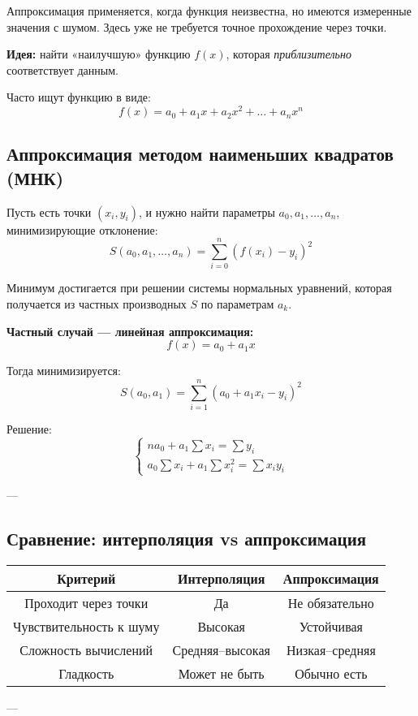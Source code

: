 Аппроксимация применяется, когда функция неизвестна, но имеются измеренные значения с шумом. Здесь уже не требуется точное прохождение через точки.

\textbf{Идея:} найти «наилучшую» функцию $f(x)$, которая \textit{приблизительно} соответствует данным.

Часто ищут функцию в виде:
\[
f(x) = a_0 + a_1 x + a_2 x^2 + \dots + a_n x^n
\]

\subsection*{Аппроксимация методом наименьших квадратов (МНК)}

Пусть есть точки $(x_i, y_i)$, и нужно найти параметры $a_0, a_1, \dots, a_n$, минимизирующие отклонение:
\[
S(a_0, a_1, \dots, a_n) = \sum_{i=0}^n \left(f(x_i) - y_i\right)^2
\]

Минимум достигается при решении системы нормальных уравнений, которая получается из частных производных $S$ по параметрам $a_k$.

\textbf{Частный случай — линейная аппроксимация:}
\[
f(x) = a_0 + a_1 x
\]

Тогда минимизируется:
\[
S(a_0, a_1) = \sum_{i=1}^{n} \left(a_0 + a_1 x_i - y_i\right)^2
\]

Решение:
\[
\begin{cases}
n a_0 + a_1 \sum x_i = \sum y_i \\
a_0 \sum x_i + a_1 \sum x_i^2 = \sum x_i y_i
\end{cases}
\]

---

\subsection*{Сравнение: интерполяция vs аппроксимация}

\begin{tabular}{|c|c|c|}
\hline
Критерий & Интерполяция & Аппроксимация \\
\hline
Проходит через точки & Да & Не обязательно \\
\hline
Чувствительность к шуму & Высокая & Устойчивая \\
\hline
Сложность вычислений & Средняя–высокая & Низкая–средняя \\
\hline
Гладкость & Может не быть & Обычно есть \\
\hline
\end{tabular}

---

